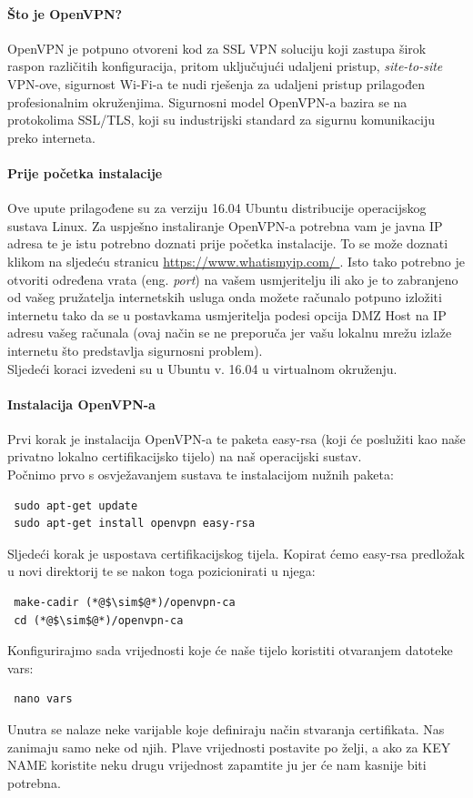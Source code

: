 


\bigbreak
\paragraph*{Što je OpenVPN?}
\hfill \smallbreak
OpenVPN\cite{openvpn} je potpuno otvoreni kod za SSL VPN soluciju koji zastupa širok raspon različitih konfiguracija, pritom uključujući udaljeni pristup, \textit{site-to-site} VPN-ove, sigurnost Wi-Fi-a te nudi rješenja za udaljeni pristup prilagođen profesionalnim okruženjima. Sigurnosni model OpenVPN-a bazira se na protokolima SSL/TLS, koji su industrijski standard za sigurnu komunikaciju preko interneta.

\bigbreak
\paragraph*{Prije početka instalacije}
\hfill \smallbreak
 Ove upute\cite{tutorialopenvpn} prilagođene su za verziju 16.04 Ubuntu distribucije operacijskog sustava Linux. Za uspješno instaliranje OpenVPN-a potrebna vam je javna IP adresa te je istu potrebno doznati prije početka instalacije. To se može doznati klikom na sljedeću stranicu \url{https://www.whatismyip.com/ }. Isto tako potrebno je otvoriti određena vrata (eng. \textit{port}) na vašem usmjeritelju ili ako je to zabranjeno od vašeg pružatelja internetskih usluga onda možete računalo potpuno izložiti internetu tako da se u postavkama usmjeritelja podesi opcija DMZ Host na IP adresu vašeg računala (ovaj način se ne preporuča jer vašu lokalnu mrežu izlaže internetu što predstavlja sigurnosni problem).
 \\
 Sljedeći koraci izvedeni su u Ubuntu v. 16.04 u virtualnom okruženju.
 
 \bigbreak
 \paragraph*{Instalacija OpenVPN-a}
 \hfill \smallbreak
 Prvi korak je instalacija OpenVPN-a te paketa easy-rsa (koji će poslužiti kao naše privatno lokalno certifikacijsko tijelo) na naš operacijski sustav. \\
 Počnimo prvo s osvježavanjem sustava te instalacijom nužnih paketa:
\begin{lstlisting}
 sudo apt-get update
 sudo apt-get install openvpn easy-rsa
\end{lstlisting}
 Sljedeći korak je uspostava certifikacijskog tijela. Kopirat ćemo easy-rsa predložak u novi direktorij te se nakon toga pozicionirati u njega:
\begin{lstlisting}
 make-cadir (*@$\sim$@*)/openvpn-ca
 cd (*@$\sim$@*)/openvpn-ca
\end{lstlisting}
Konfigurirajmo sada vrijednosti koje će naše tijelo koristiti otvaranjem datoteke vars:
\begin{lstlisting}
 nano vars
\end{lstlisting}
Unutra se nalaze neke varijable koje definiraju način stvaranja certifikata. Nas zanimaju samo neke od njih. Plave vrijednosti postavite po želji, a ako za KEY NAME koristite neku drugu vrijednost zapamtite ju jer će nam kasnije biti potrebna.

